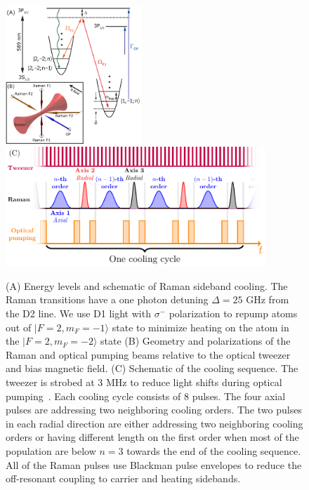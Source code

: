 \documentclass[aps,prl,twocolumn,groupedaddress]{revtex4-1}
\begin{document}
\begin{figure}
  \includegraphics[height=5.2cm]{imgs/Na_RSC_schematic.pdf}
  \includegraphics[height=4.5cm]{sequence.pdf}
  \caption{(A) Energy levels and schematic of Raman sideband cooling.
    The Raman transitions have a one photon detuning $\Delta=25$ GHz from the D2 line.
    We use D1 light with $\sigma^-$ polarization to repump atoms out of $|F=2,m_F=-1\rangle$
    state to minimize heating on the atom in the $|F=2,m_F=-2\rangle$ state
    (B) Geometry and polarizations of the Raman and optical pumping beams relative to the
    optical tweezer and bias magnetic field.
    (C) Schematic of the cooling sequence. The tweezer is strobed at 3 MHz to
    reduce light shifts during optical pumping~\cite{Hutzler2017-LightShifts}.
    Each cooling cycle consists of $8$ pulses.
    The four axial pulses are addressing two neighboring cooling orders.
    The two pulses in each radial direction are either addressing two neighboring cooling orders
    or having different length on the first order when most of the population are below $n=3$
    towards the end of the cooling sequence.
    All of the Raman pulses use Blackman pulse envelopes to reduce the off-resonant
    coupling to carrier and heating sidebands.
    \label{f-setup}}
\end{figure}
\end{document}
